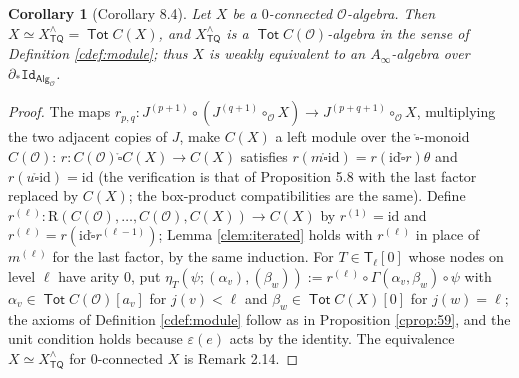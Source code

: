 \documentclass[12pt]{article}
\theoremstyle{plain}
\newtheorem{ccorollary}[ctheorem]{Corollary}
\theoremstyle{definition}
\theoremstyle{remark}
\newcommand{\Cal}[1]{\mathcal{#1}}
\newcommand{\Alg}[1]{\mathsf{Alg}_{\mathcal{#1}}}
\newcommand{\Id}{\mathtt{Id}}
\newcommand{\TQ}{\mathsf{TQ}}
\newcommand{\Tot}{\operatorname{\mathsf{Tot}}}
\newcommand{\boxcirc}{\mathring{\square}}
\newcommand{\id}{\mathrm{id}}
\newcommand{\Tr}{\mathsf{T}}
\newcommand{\Rr}{\mathrm{R}}
\begin{document}
\begin{ccorollary}[Corollary 8.4]\label{ccor:84}
Let $X$ be a $0$-connected $\Cal O$-algebra. Then $X\simeq X^\wedge_{\TQ}=\Tot C(X)$, and $X^\wedge_{\TQ}$ is a $\Tot C(\Cal O)$-algebra in the sense of Definition \ref{cdef:module}; thus $X$ is weakly equivalent to an $A_\infty$-algebra over $\partial_*\Id_{\Alg{O}}$.
\end{ccorollary}

\begin{proof}
The maps $r_{p,q}\colon J^{(p+1)}\circ(J^{(q+1)}\circ_{\Cal O}X)\to J^{(p+q+1)}\circ_{\Cal O}X$, multiplying the two adjacent copies of $J$, make $C(X)$ a left module over the $\boxcirc$-monoid $C(\Cal O)$: $r\colon C(\Cal O)\boxcirc C(X)\to C(X)$ satisfies $r(m\boxcirc\id)=r(\id\boxcirc r)\theta$ and $r(u\boxcirc\id)=\id$ (the verification is that of Proposition 5.8 with the last factor replaced by $C(X)$; the box-product compatibilities are the same). Define $r^{(\ell)}\colon\Rr(C(\Cal O),\dots,C(\Cal O),C(X))\to C(X)$ by $r^{(1)}=\id$ and $r^{(\ell)}=r(\id\boxcirc r^{(\ell-1)})$; Lemma \ref{clem:iterated} holds with $r^{(\ell)}$ in place of $m^{(\ell)}$ for the last factor, by the same induction. For $T\in\Tr_\ell[0]$ whose nodes on level $\ell$ have arity $0$, put $\eta_T(\psi;(\alpha_v),(\beta_w)):=r^{(\ell)}\circ\Gamma(\alpha_v,\beta_w)\circ\psi$ with $\alpha_v\in\Tot C(\Cal O)[a_v]$ for $j(v)<\ell$ and $\beta_w\in\Tot C(X)[0]$ for $j(w)=\ell$; the axioms of Definition \ref{cdef:module} follow as in Proposition \ref{cprop:59}, and the unit condition holds because $\varepsilon(e)$ acts by the identity. The equivalence $X\simeq X^\wedge_{\TQ}$ for $0$-connected $X$ is Remark 2.14.
\end{proof}
\end{document}
